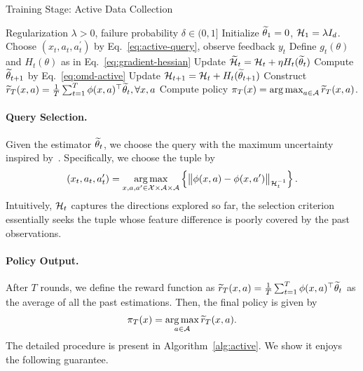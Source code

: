 \begin{algorithm}[!t]
  \caption{Training Stage: Active Data Collection}
  \label{alg:active}
  \begin{algorithmic}[1]
      \REQUIRE Regularization $\lambda>0$, failure probability $\delta \in(0,1]$
      \STATE Initialize $\widetilde{\theta}_1=0$, $\mathcal{H}_1 = \lambda I_d$.
      \STATE Choose $(x_t, a_t, a_t^{\prime})$ by Eq.~\eqref{eq:active-query}, observe feedback $y_t$
      \STATE Define $g_t(\theta)$ and $H_t(\theta)$ as in Eq.~\eqref{eq:gradient-hessian}
      \STATE Update $\widetilde{\mathcal{H}}_t = \mathcal{H}_t + \eta H_t(\widetilde{\theta}_t)$
      \STATE Compute $\widetilde{\theta}_{t+1}$ by Eq.~\eqref{eq:omd-active}
      \STATE Update $\mathcal{H}_{t+1} = \mathcal{H}_{t} + H_t(\widetilde{\theta}_{t+1})$
      \ENDFOR
      \STATE Construct $\widetilde{r}_T(x, a) = \frac{1}{T} \sum_{t=1}^T \phi(x, a)^\top \widetilde{\theta}_t, \forall x, a$
      \ENSURE Compute policy $\pi_T(x) = \operatorname*{arg\,max}_{a \in \mathcal{A}} \widetilde{r}_T(x, a)$.
  \end{algorithmic}
\end{algorithm}

\paragraph{Query Selection.} Given the estimator $\widetilde{\theta}_t$, we choose the query with the maximum uncertainty inspired by~\citep{arXiv'24:Das-RLHF-active}. Specifically, we choose the tuple by
\begin{align}
  \label{eq:active-query}
  (x_t, a_t, a_t^{\prime}) = \operatorname*{arg\,max}_{x, a, a^{\prime} \in \mathcal{X} \times \mathcal{A} \times \mathcal{A}} \left\{\big\lVert\phi(x, a) - \phi(x, a')\big\rVert_{\mathcal{H}_t^{-1}}\right\}.
\end{align}
Intuitively, $\mathcal{H}_t$ captures the directions explored so far, the selection criterion essentially seeks the tuple whose feature difference is poorly covered by the past observations. 

\paragraph{Policy Output.} After $T$ rounds, we define the reward function as $\widetilde{r}_T(x, a) = \frac{1}{T} \sum_{t=1}^T \phi(x, a)^\top \widetilde{\theta}_t$ as the average of all the past estimations. Then, the final policy is given by
\begin{align}
  \label{eq:active-policy}
  \pi_T(x) = \operatorname*{arg\,max}_{a \in \mathcal{A}} \widetilde{r}_T(x, a).
\end{align}
The detailed procedure is present in Algorithm~\ref{alg:active}. We show it enjoys the following guarantee.

